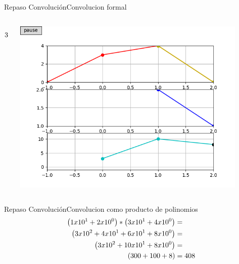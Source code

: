 \begin{frame}{Repaso Convolución}{Convolucion formal}
\begin{columns}[c]
\begin{column}{0.4\textwidth}
\begin{align*}
               \cline{1-2}
               3 \hspace{1cm} 10 \hspace{1cm} 8\\
            \end{align*}
      \end{column}
      \hspace{2pt}
      \vrule
      \hspace{2pt}
      \begin{column}{0.6\textwidth}
         \centering\includegraphics[width=0.9\textwidth]{5_clase/conv_as_multiply2}
      \end{column}
   \end{columns}
   \vfill
\end{frame}
\begin{frame}{Repaso Convolución}{Convolucion como producto de polinomios}
   \begin{align*}
   \large
      \left( 1 x10^1 + 2 x10^0 \right) * \left( 3 x10^1 + 4 x10^0 \right) &=  \\
      \left( 3 x10^2 + 4 x10^1 + 6 x10^1 + 8 x10^0\right) &=  \\
      \left( 3 x10^2 + 10 x10^1 + 8 x10^0\right) &=  \\
      \left( 300 + 100 + 8\right) &= 408
   \end{align*}
   \vfill
\end{frame}
